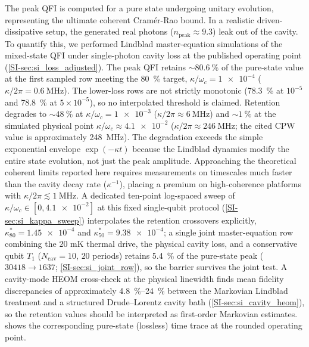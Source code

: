 \documentclass[aps,prxquantum,preprint,superscriptaddress,amsmath,amssymb]{revtex4-2}
\begin{document}
The peak QFI is computed for a pure state undergoing unitary evolution, representing the ultimate coherent Cram\'er-Rao bound. In a realistic driven-dissipative setup, the generated real photons ($n_{\text{peak}} \approx \num{9.3}$) leak out of the cavity. To quantify this, we performed Lindblad master-equation simulations of the mixed-state QFI under single-photon cavity loss at the published operating point (\cref{SI-sec:si_loss_adjusted}). The peak QFI retains $\sim\qty{80.6}{\percent}$ of the pure-state value at the first sampled row meeting the \qty{80}{\percent} target, $\kappa/\omega_c = \num{1e-4}$ ($\kappa/2\pi = \qty{0.6}{\mega\hertz}$). The lower-loss rows are not strictly monotonic (\qty{78.3}{\percent} at $10^{-5}$ and \qty{78.8}{\percent} at $5\times10^{-5}$), so no interpolated threshold is claimed. Retention degrades to $\sim\qty{48}{\percent}$ at $\kappa/\omega_c = \num{1e-3}$ ($\kappa/2\pi \approx \qty{6}{\mega\hertz}$) and $\sim\qty{1}{\percent}$ at the simulated physical point $\kappa/\omega_c \approx \num{4.1e-2}$ ($\kappa/2\pi \approx \qty{246}{\mega\hertz}$; the cited CPW value is approximately \qty{248}{\mega\hertz}). The degradation exceeds the simple exponential envelope $\exp(-\kappa t)$ because the Lindblad dynamics modify the entire state evolution, not just the peak amplitude. Approaching the theoretical coherent limits reported here requires measurements on timescales much faster than the cavity decay rate ($\kappa^{-1}$), placing a premium on high-coherence platforms with $\kappa/2\pi \lesssim \qty{1}{\mega\hertz}$. A dedicated ten-point log-spaced sweep of $\kappa/\omega_c\in[0,\num{4.1e-2}]$ at this fixed single-qubit protocol (\cref{SI-sec:si_kappa_sweep}) interpolates the retention crossovers explicitly, $\kappa^{\ast}_{80}=\num{1.45e-4}$ and $\kappa^{\ast}_{50}=\num{9.38e-4}$; a single joint master-equation row combining the $20$ mK thermal drive, the physical cavity loss, and a conservative qubit $T_1$ ($N_{\text{cav}}=\num{10}$, $20$ periods) retains \qty{5.4}{\percent} of the pure-state peak ($\num{30418}\to\num{1637}$; \cref{SI-sec:si_joint_row}), so the barrier survives the joint test. A cavity-mode HEOM cross-check at the physical linewidth finds mean fidelity discrepancies of approximately \qty{4.8}{\percent}--\qty{24}{\percent} between the Markovian Lindblad treatment and a structured Drude--Lorentz cavity bath (\cref{SI-sec:si_cavity_heom}), so the retention values should be interpreted as first-order Markovian estimates.  shows the corresponding pure-state (lossless) time trace at the rounded operating point.
\end{document}
